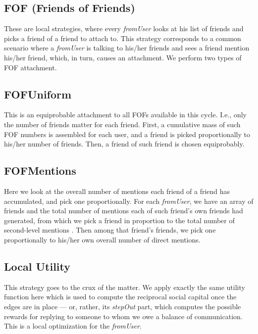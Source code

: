 \documentclass[10pt,oneside]{memoir}
\begin{document}
\subsection{FOF (Friends of Friends)}
\label{foffriendsoffriends}

These are local strategies, where every \emph{fromUser} looks at his list of friends and picks a friend of a friend to attach to.  This strategy corresponds to a common scenario where a \emph{fromUser} is talking to his/her friends and sees a friend mention his/her friend, which, in turn, causes an attachment.  We perform two types of FOF attachment.


\subsection{FOFUniform}
\label{fofuniform}

This is an equiprobable attachment to all FOFs available in this cycle.  I.e., only the number of friends matter for each friend.  First, a cumulative mass of such FOF numbers is assembled for each user, and a friend is picked proportionally to his/her number of friends.  Then, a friend of such friend is chosen equiprobably.


\subsection{FOFMentions}
\label{fofmentions}

Here we look at the overall number of mentions each friend of a friend has accumulated, and pick one proportionally.  For each {\itshape fromUser}, we have an array of friends and the total number of mentions each of such friend's own friends had generated, from which we pick a friend in proportion to the total number of second-level mentions .  Then among that friend's friends, we pick one proportionally to his/her own overall number of direct mentions.


\subsection{Local Utility}
\label{localutility}

This strategy goes to the crux of the matter.  We apply exactly the same utility function here which is used to compute the reciprocal social capital once the edges are in place --- or, rather, its {\itshape stepOut} part, which computes the possible rewards for replying to someone to whom we owe a balance of communication.  This is a local optimization for the {\itshape fromUser}. 
\end{document}
